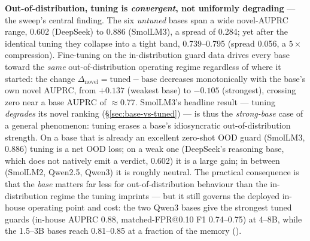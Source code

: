 \documentclass[sigconf,nonacm]{acmart}
\begin{document}
\textbf{Out-of-distribution, tuning is \emph{convergent}, not uniformly degrading} --- the sweep's central finding. The six \emph{untuned} bases span a wide novel-AUPRC range, 0.602 (DeepSeek) to 0.886 (SmolLM3), a spread of 0.284; yet after the identical tuning they collapse into a tight band, 0.739--0.795 (spread 0.056, a $5\times$ compression). Fine-tuning on the in-distribution guard data drives every base toward the \emph{same} out-of-distribution operating regime regardless of where it started: the change $\Delta_{\text{novel}}=\text{tuned}-\text{base}$ decreases monotonically with the base's own novel AUPRC, from $+0.137$ (weakest base) to $-0.105$ (strongest), crossing zero near a base AUPRC of $\approx$0.77. SmolLM3's headline result --- tuning \emph{degrades} its novel ranking (\S\ref{sec:base-vs-tuned}) --- is thus the \emph{strong-base} case of a general phenomenon: tuning erases a base's idiosyncratic out-of-distribution strength. On a base that is already an excellent zero-shot OOD guard (SmolLM3, 0.886) tuning is a net OOD loss; on a weak one (DeepSeek's reasoning base, which does not natively emit a verdict, 0.602) it is a large gain; in between (SmolLM2, Qwen2.5, Qwen3) it is roughly neutral. The practical consequence is that the \emph{base} matters far less for out-of-distribution behaviour than the in-distribution regime the tuning imprints --- but it still governs the deployed in-house operating point and cost: the two Qwen3 bases give the strongest tuned guards (in-house AUPRC 0.88, matched-FPR@0.10 F1 0.74--0.75) at 4--8B, while the 1.5--3B bases reach 0.81--0.85 at a fraction of the memory ().
\end{document}
